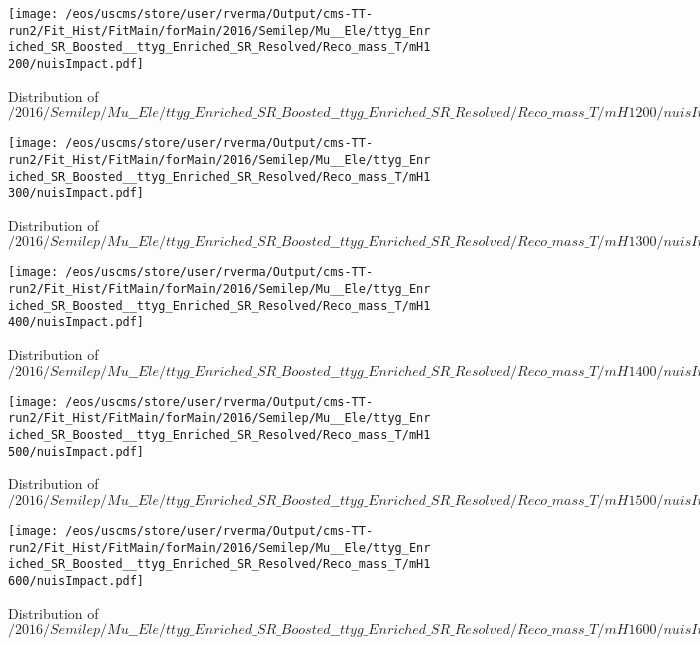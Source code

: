 \begin{figure}
\centering
\texttt{[image: /eos/uscms/store/user/rverma/Output/cms-TT-run2/Fit\_Hist/FitMain/forMain/2016/Semilep/Mu\_\_Ele/ttyg\_Enriched\_SR\_Boosted\_\_ttyg\_Enriched\_SR\_Resolved/Reco\_mass\_T/mH1200/nuisImpact.pdf]}
\caption{Distribution of $/2016/Semilep/Mu\_\_Ele/ttyg\_Enriched\_SR\_Boosted\_\_ttyg\_Enriched\_SR\_Resolved/Reco\_mass\_T/mH1200/nuisImpact.pdf$}
\end{figure}

\begin{figure}
\centering
\texttt{[image: /eos/uscms/store/user/rverma/Output/cms-TT-run2/Fit\_Hist/FitMain/forMain/2016/Semilep/Mu\_\_Ele/ttyg\_Enriched\_SR\_Boosted\_\_ttyg\_Enriched\_SR\_Resolved/Reco\_mass\_T/mH1300/nuisImpact.pdf]}
\caption{Distribution of $/2016/Semilep/Mu\_\_Ele/ttyg\_Enriched\_SR\_Boosted\_\_ttyg\_Enriched\_SR\_Resolved/Reco\_mass\_T/mH1300/nuisImpact.pdf$}
\end{figure}

\begin{figure}
\centering
\texttt{[image: /eos/uscms/store/user/rverma/Output/cms-TT-run2/Fit\_Hist/FitMain/forMain/2016/Semilep/Mu\_\_Ele/ttyg\_Enriched\_SR\_Boosted\_\_ttyg\_Enriched\_SR\_Resolved/Reco\_mass\_T/mH1400/nuisImpact.pdf]}
\caption{Distribution of $/2016/Semilep/Mu\_\_Ele/ttyg\_Enriched\_SR\_Boosted\_\_ttyg\_Enriched\_SR\_Resolved/Reco\_mass\_T/mH1400/nuisImpact.pdf$}
\end{figure}

\begin{figure}
\centering
\texttt{[image: /eos/uscms/store/user/rverma/Output/cms-TT-run2/Fit\_Hist/FitMain/forMain/2016/Semilep/Mu\_\_Ele/ttyg\_Enriched\_SR\_Boosted\_\_ttyg\_Enriched\_SR\_Resolved/Reco\_mass\_T/mH1500/nuisImpact.pdf]}
\caption{Distribution of $/2016/Semilep/Mu\_\_Ele/ttyg\_Enriched\_SR\_Boosted\_\_ttyg\_Enriched\_SR\_Resolved/Reco\_mass\_T/mH1500/nuisImpact.pdf$}
\end{figure}

\begin{figure}
\centering
\texttt{[image: /eos/uscms/store/user/rverma/Output/cms-TT-run2/Fit\_Hist/FitMain/forMain/2016/Semilep/Mu\_\_Ele/ttyg\_Enriched\_SR\_Boosted\_\_ttyg\_Enriched\_SR\_Resolved/Reco\_mass\_T/mH1600/nuisImpact.pdf]}
\caption{Distribution of $/2016/Semilep/Mu\_\_Ele/ttyg\_Enriched\_SR\_Boosted\_\_ttyg\_Enriched\_SR\_Resolved/Reco\_mass\_T/mH1600/nuisImpact.pdf$}
\end{figure}


